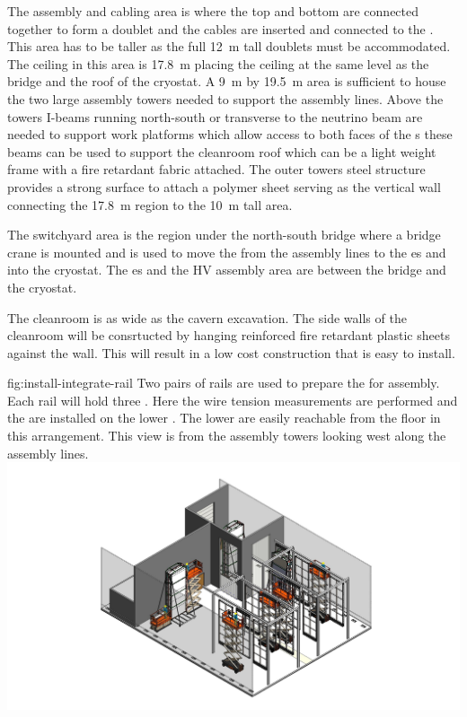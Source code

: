 The  assembly and cabling area is where the top and bottom  are connected together to form a doublet and the  cables are inserted and connected to the . 
This area has to be taller as the full \SI{12}{m} tall  doublets must be accommodated. 
The ceiling in this area is \SI{17.8}{m} placing the ceiling at the same level as the bridge and the roof of the cryostat. 
A \SI{9}{m} by \SI{19.5}{m} area is sufficient to house the two large assembly towers needed to support the assembly lines. Above the towers I-beams running north-south or transverse to the neutrino beam are needed to support work platforms which allow access to both faces of the s these beams can be used to support the cleanroom roof which can be a light weight frame with a fire retardant fabric attached. 
The outer towers steel structure provides a strong surface to attach a polymer sheet serving as the vertical wall connecting the \SI{17.8}{m} region to the \SI{10}{m} tall area.

The switchyard area is the region under the north-south bridge where a bridge crane is mounted and is used to move the  from the assembly lines to the \coldbox{}es and into the cryostat. The \coldbox{}es and the HV assembly area are between the bridge and the cryostat.


The cleanroom is as wide as the cavern excavation. The side walls of the cleanroom will be consrtucted by hanging reinforced fire retardant plastic sheets against the wall. This will result in a low cost construction that is easy to install.


\begin{dunefigure}{fig:install-integrate-rail}
  {Two pairs of rails are used to prepare the  for assembly. Each rail will hold three . Here the wire tension measurements are performed and the   are installed on the lower . The lower  are easily reachable from the floor in this arrangement. This view is from the assembly towers looking west along the assembly lines.}
\includegraphics[width=.6\textwidth]{graphics/install-integrate-rail.pdf}
\end{dunefigure}

